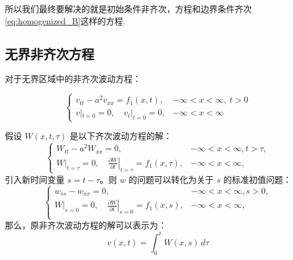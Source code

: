 \documentclass[a4paper, 12pt, oneside]{article} %
\numberwithin{subsection}{section}
\numberwithin{subsubsection}{subsection}
\theoremstyle{plain}
\theoremstyle{definition}
\theoremstyle{remark}
\begin{document}
		所以我们最终要解决的就是初始条件非齐次，方程和边界条件齐次\eqref{eq:homogenized_B}这样的方程.
		
		
		
		
		\subsection{无界非齐次方程}
		对于无界区域中的非齐次波动方程：
		
		\begin{equation}
			\begin{cases}
				v_{tt} - a^2 v_{xx} = f_1(x, t), & -\infty < x < \infty, \ t > 0 \\
				v|_{t=0} = 0, \quad v_t|_{t=0} = 0, & -\infty < x < \infty
			\end{cases}
		\end{equation}
		
		假设 \(W(x, t, \tau)\) 是以下齐次波动方程的解：
		\begin{equation}
			\begin{cases}
				W_{tt} - a^2 W_{xx} = 0, &-\infty < x < \infty, t > \tau, \\
				W|_{t=\tau} = 0, \quad \left. \frac{\partial W}{\partial t} \right|_{t=\tau} = f_1(x, \tau), & -\infty < x < \infty,
			\end{cases}
		\end{equation}
		引入新时间变量 $s = t-\tau$。则 $w$ 的问题可以转化为关于 $s$ 的标准初值问题：
		\begin{equation}
			\begin{cases}
				w_{ss} - w_{xx} = 0, &-\infty < x < \infty,s > 0, \\
				W|_{s=0} = 0, \quad \left. \frac{\partial W}{\partial t} \right|_{s=0} = f_1(x, s), & -\infty < x < \infty,\\
				
			\end{cases}
		\end{equation}	
		那么，原非齐次波动方程的解可以表示为：
		\begin{equation}
			v(x, t) = \int_0^t W(x, s) \, d\tau
		\end{equation}
		
\end{document}
